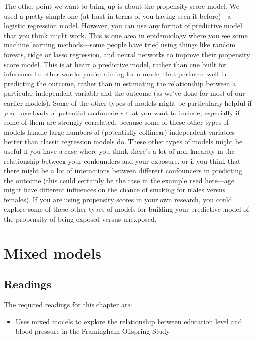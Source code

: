 \documentclass[
]{book}
\providecommand{\tightlist}{%
  \setlength{\itemsep}{0pt}\setlength{\parskip}{0pt}}
\begin{document}
The other point we want to bring up is about the propensity score model. We used a pretty simple one (at least in terms of you having seen it before)---a logistic regression model. However, you can use any format of predictive model that you think might work. This is one area in epidemiology where you see some machine learning methods---some people have tried using things like random forests, ridge or lasso regression, and neural networks to improve their propensity score model. This is at heart a predictive model, rather than one built for inference. In other words, you're aiming for a model that performs well in predicting the outcome, rather than in estimating the relationship between a particular independent variable and the outcome (as we've done for most of our earlier models). Some of the other types of models might be particularly helpful if you have loads of potential confounders that you want to include, especially if some of them are strongly correlated, because some of these other types of models handle large numbers of (potentially collinear) independent variables better than classic regression models do. These other types of models might be useful if you have a case where you think there's a lot of non-linearity in the relationship between your confounders and your exposure, or if you think that there might be a lot of interactions between different confounders in predicting the outcome (this could certainly be the case in the example used here---age might have different influences on the chance of smoking for males versus females). If you are using propensity scores in your own research, you could explore some of these other types of models for building your predictive model of the propensity of being exposed versus unexposed.

\chapter{Mixed models}\label{mixed-models}

\section{Readings}\label{readings-6}

The required readings for this chapter are:

\begin{itemize}
\tightlist
\item
  \citet{loucks2011associations} Uses mixed models to explore the relationship between
  education level and blood pressure in the Framingham Offspring Study
\end{itemize}
\end{document}
